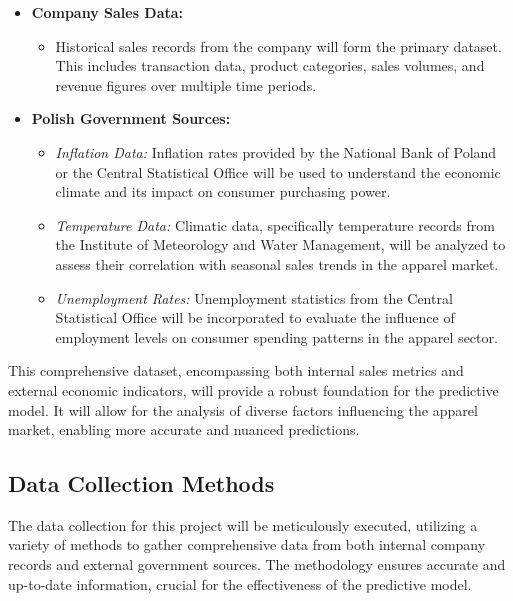 \documentclass{article}
\begin{document}
\begin{itemize}
    \item \textbf{Company Sales Data:}
    \begin{itemize}
        \item Historical sales records from the company will form the primary dataset. This includes transaction data, product categories, sales volumes, and revenue figures over multiple time periods.
    \end{itemize}
    
    \item \textbf{Polish Government Sources:}
    \begin{itemize}
        \item \textit{Inflation Data:} Inflation rates provided by the National Bank of Poland or the Central Statistical Office will be used to understand the economic climate and its impact on consumer purchasing power.
        \item \textit{Temperature Data:} Climatic data, specifically temperature records from the Institute of Meteorology and Water Management, will be analyzed to assess their correlation with seasonal sales trends in the apparel market.
        \item \textit{Unemployment Rates:} Unemployment statistics from the Central Statistical Office will be incorporated to evaluate the influence of employment levels on consumer spending patterns in the apparel sector.
    \end{itemize}
\end{itemize}

This comprehensive dataset, encompassing both internal sales metrics and external economic indicators, will provide a robust foundation for the predictive model. It will allow for the analysis of diverse factors influencing the apparel market, enabling more accurate and nuanced predictions.


\subsection{Data Collection Methods}
The data collection for this project will be meticulously executed, utilizing a variety of methods to gather comprehensive data from both internal company records and external government sources. The methodology ensures accurate and up-to-date information, crucial for the effectiveness of the predictive model.
\end{document}
